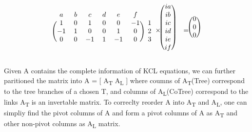 \documentclass[conference]{IEEEtran}
\begin{document}
\begin{equation}
  \begin{array}{c@{}c@{}c@{}c@{}c}  %
  \begin{blockarray}{ccccccc}
  a & b & c & d & e & f \\
  \begin{block}{(cccccc)c}
    1 & 0 & 1 & 0 & 0 & -1 & 1 \\
    -1 & 1 & 0 & 0 & 1 & 0 & 2 \\
    0 & 0 & -1 & 1 & -1 & 0 & 3 \\
  \end{block}
  \end{blockarray}
  &
  \times
  &
  \begin{blockarray}{cc}
  \begin{block}{(c)c}
    ia & \\
    ib & \\
    ic & \\ 
    id & \\
    ie & \\ 
    if & \\
  \end{block}
  \end{blockarray}
  & 
  =
  &
  \begin{blockarray}{c}
  \begin{block}{(c)}
    0\\
    0\\
    0\\
  \end{block}
  \end{blockarray}
  \end{array}
  \label{eq:reducedIncidentMatrix}
\end{equation}



Given A contains the complete information of KCL equations, we can further paritioned the matrix into
A  = [ A\textsubscript{T}  A\textsubscript{L} ] where coumns of A\textsubscript{T}(Tree) correspond to the tree
branches of a chosen T, and columns of A\textsubscript{L}(CoTree) correspond to the links A\textsubscript{T} is an invertable matrix.
To correclty reorder A into A\textsubscript{T} and A\textsubscript{L}, one can simpliy find the pivot columns of A
and form a pivot columns of A as A\textsubscript{T} and other non-pivot columns as A\textsubscript{L} matrix.
\end{document}
